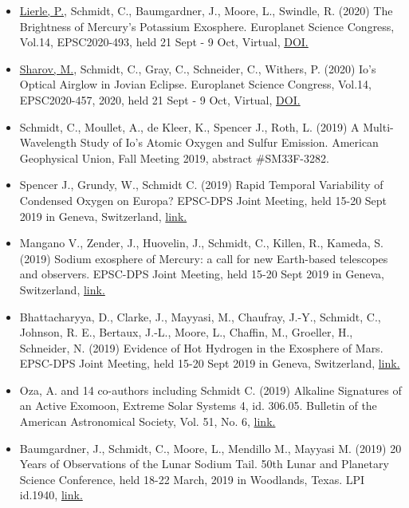 \documentclass[12pt]{report}
\begin{document}
\begin{itemize}
   \item \underline{Lierle, P.}, Schmidt, C., Baumgardner, J., Moore, L., Swindle, R. (2020) The Brightness of Mercury's Potassium Exosphere. Europlanet Science Congress, Vol.14, EPSC2020-493, held 21 Sept - 9 Oct, Virtual, \href{https://doi.org/10.5194/epsc2020-493}{DOI.}
   \item \underline{Sharov, M.}, Schmidt, C., Gray, C., Schneider, C., Withers, P. (2020) Io's Optical Airglow in Jovian Eclipse. Europlanet Science Congress, Vol.14, EPSC2020-457, 2020, held 21 Sept - 9 Oct, Virtual, \href{https://doi.org/10.5194/epsc2020-457}{DOI.}
   \item Schmidt, C., Moullet, A., de Kleer, K., Spencer J., Roth, L. (2019) A Multi-Wavelength Study of Io's Atomic Oxygen and Sulfur Emission. American Geophysical Union, Fall Meeting 2019, abstract \#SM33F-3282.
   \item Spencer J., Grundy, W., Schmidt C. (2019) Rapid Temporal Variability of Condensed Oxygen on Europa? EPSC-DPS Joint Meeting, held 15-20 Sept 2019 in Geneva, Switzerland, \href{https://meetingorganizer.copernicus.org/EPSC-DPS2019/EPSC-DPS2019-935-1.pdf}{link.}
   \item Mangano V., Zender, J., Huovelin, J., Schmidt, C., Killen, R., Kameda, S. (2019) Sodium exosphere of Mercury: a call for new Earth-based telescopes and observers. EPSC-DPS Joint Meeting, held 15-20 Sept 2019 in Geneva, Switzerland, \href{https://meetingorganizer.copernicus.org/EPSC-DPS2019/EPSC-DPS2019-1967-2.pdf}{link.}
   \item Bhattacharyya, D., Clarke, J., Mayyasi, M., Chaufray, J.-Y., Schmidt, C., Johnson, R. E., Bertaux, J.-L., Moore, L., Chaffin, M., Groeller, H., Schneider, N. (2019) Evidence of Hot Hydrogen in the Exosphere of Mars. EPSC-DPS Joint Meeting, held 15-20 Sept 2019 in Geneva, Switzerland, \href{https://meetingorganizer.copernicus.org/EPSC-DPS2019/EPSC-DPS2019-960-1.pdf}{link.}
   \item Oza, A. and 14 co-authors including Schmidt C. (2019) Alkaline Signatures of an Active Exomoon, Extreme Solar Systems 4, id. 306.05. Bulletin of the American Astronomical Society, Vol. 51, No. 6, \href{https://113qx216in8z1kdeyi404hgf-wpengine.netdna-ssl.com/wp-content/uploads/2019/09/exss4_abstracts.pdf#abs306.05}{link.}
   \item Baumgardner, J., Schmidt, C., Moore, L., Mendillo M., Mayyasi M. (2019) 20 Years of Observations of the Lunar Sodium Tail. 50th Lunar and Planetary Science Conference, held 18-22 March, 2019 in Woodlands, Texas. LPI id.1940, \href{https://www.hou.usra.edu/meetings/lpsc2019/pdf/1940.pdf}{link.}

\end{itemize}
\end{document}
